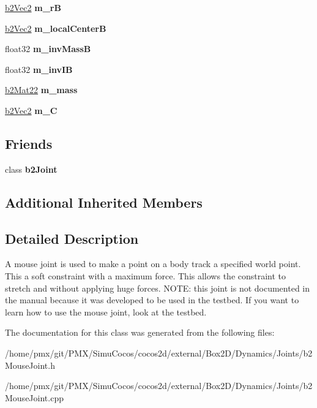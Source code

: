 \begin{DoxyCompactItemize}
\hyperlink{structb2Vec2}{b2\+Vec2} {\bfseries m\+\_\+rB}
\item 
\mbox{\label{classb2MouseJoint_ad9947876df55f4b4e7d435941234e22e}} 
\hyperlink{structb2Vec2}{b2\+Vec2} {\bfseries m\+\_\+local\+CenterB}
\item 
\mbox{\label{classb2MouseJoint_a84c405322a35b0f2649071cdcd7be0fb}} 
float32 {\bfseries m\+\_\+inv\+MassB}
\item 
\mbox{\label{classb2MouseJoint_a0a4959ae588d0071d97424e36f15228e}} 
float32 {\bfseries m\+\_\+inv\+IB}
\item 
\mbox{\label{classb2MouseJoint_a628b7a7a2cd2b50313daea30baf47c4e}} 
\hyperlink{structb2Mat22}{b2\+Mat22} {\bfseries m\+\_\+mass}
\item 
\mbox{\label{classb2MouseJoint_a7ea02e17cdde70717e84bf44614275fb}} 
\hyperlink{structb2Vec2}{b2\+Vec2} {\bfseries m\+\_\+C}
\end{DoxyCompactItemize}
\subsection*{Friends}
\begin{DoxyCompactItemize}
\item 
\mbox{\label{classb2MouseJoint_a2f8aeb7f12b8fbe115431953a4926eed}} 
class {\bfseries b2\+Joint}
\end{DoxyCompactItemize}
\subsection*{Additional Inherited Members}


\subsection{Detailed Description}
A mouse joint is used to make a point on a body track a specified world point. This a soft constraint with a maximum force. This allows the constraint to stretch and without applying huge forces. N\+O\+TE\+: this joint is not documented in the manual because it was developed to be used in the testbed. If you want to learn how to use the mouse joint, look at the testbed. 

The documentation for this class was generated from the following files\+:\begin{DoxyCompactItemize}
\item 
/home/pmx/git/\+P\+M\+X/\+Simu\+Cocos/cocos2d/external/\+Box2\+D/\+Dynamics/\+Joints/b2\+Mouse\+Joint.\+h\item 
/home/pmx/git/\+P\+M\+X/\+Simu\+Cocos/cocos2d/external/\+Box2\+D/\+Dynamics/\+Joints/b2\+Mouse\+Joint.\+cpp\end{DoxyCompactItemize}

